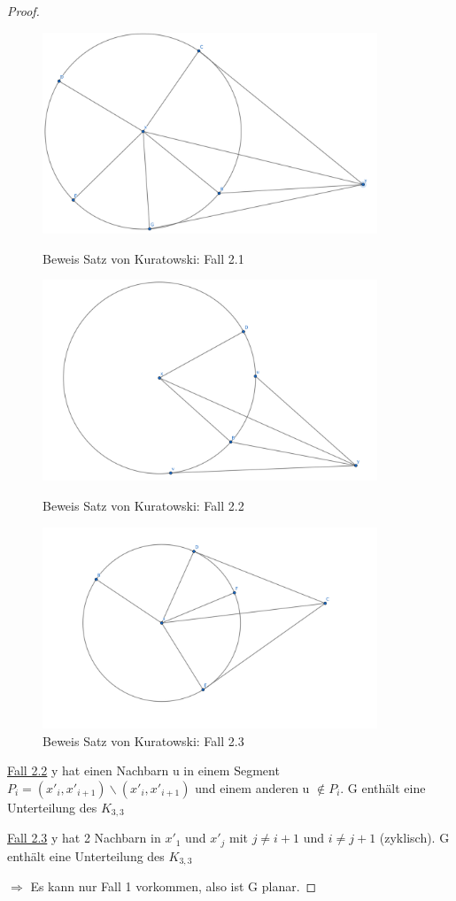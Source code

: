 \begin{proof}
\begin{figure}[h!]
    \begin{center}
        \includegraphics[width=10cm]{fall21}
        \caption{Beweis Satz von Kuratowski: Fall 2.1}
        \label{fig:}
    \end{center}
    \begin{center}
        \includegraphics[width=10cm]{fall22}
        \caption{Beweis Satz von Kuratowski: Fall 2.2}
        \label{fig:}
    \end{center}
    \begin{center}
        \includegraphics[width=10cm]{fall23}
        \caption{Beweis Satz von Kuratowski: Fall 2.3}
        \label{fig:}
    \end{center}
\end{figure}

\underline{Fall 2.2} y hat  einen Nachbarn u in einem Segment $ P_i = (x'_i, x'_{i+1}) \backslash(x'_i, x'_{i+1}) $ und einem anderen u $ \notin P_i $. 
G enthält eine Unterteilung des $ K_{3,3} $


\underline{Fall 2.3} y hat 2 Nachbarn in $ x'_1$ und $ x'_j $ mit $ j \neq i+1 $ und $ i \neq j+1 $ (zyklisch). G enthält eine Unterteilung des $ K_{3,3} $

$ \Rightarrow $ Es kann nur Fall 1 vorkommen, also ist G planar. 
\end{proof}

